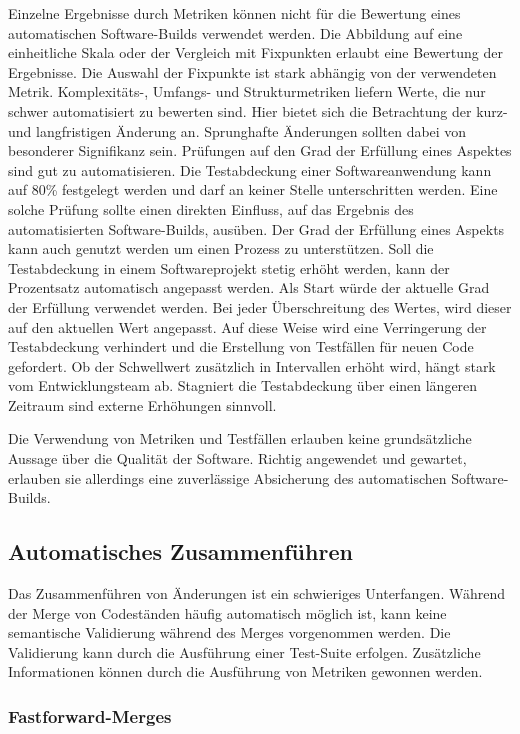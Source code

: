 Einzelne Ergebnisse durch Metriken können nicht für die Bewertung eines automatischen Software-Builds verwendet werden. Die Abbildung auf eine einheitliche Skala oder der Vergleich mit Fixpunkten erlaubt eine Bewertung der Ergebnisse. Die Auswahl der Fixpunkte ist stark abhängig von der verwendeten Metrik. Komplexitäts-, Umfangs- und Strukturmetriken liefern Werte, die nur schwer automatisiert zu bewerten sind. Hier bietet sich die Betrachtung der kurz- und langfristigen Änderung an. Sprunghafte Änderungen sollten dabei von besonderer Signifikanz sein. Prüfungen auf den Grad der Erfüllung eines Aspektes sind gut zu automatisieren. Die Testabdeckung einer Softwareanwendung kann auf 80\% festgelegt werden und darf an keiner Stelle unterschritten werden. Eine solche Prüfung sollte einen direkten Einfluss, auf das Ergebnis des automatisierten Software-Builds, ausüben. Der Grad der Erfüllung eines Aspekts kann auch genutzt werden um einen Prozess zu unterstützen. Soll die Testabdeckung in einem Softwareprojekt stetig erhöht werden, kann der Prozentsatz automatisch angepasst werden. Als Start würde der aktuelle Grad der Erfüllung verwendet werden. Bei jeder Überschreitung des Wertes, wird dieser auf den aktuellen Wert angepasst. Auf diese Weise wird eine Verringerung  der Testabdeckung verhindert und die Erstellung von Testfällen für neuen Code gefordert. Ob der Schwellwert zusätzlich in Intervallen erhöht wird, hängt stark vom Entwicklungsteam ab. Stagniert die Testabdeckung über einen längeren Zeitraum sind externe Erhöhungen sinnvoll.

Die Verwendung von Metriken und Testfällen erlauben keine grundsätzliche Aussage über die Qualität der Software. Richtig angewendet und gewartet, erlauben sie allerdings eine zuverlässige Absicherung des automatischen Software-Builds.

\subsection{Automatisches Zusammenführen}

Das Zusammenführen von Änderungen ist ein schwieriges Unterfangen. Während der Merge von Codeständen häufig automatisch möglich ist, kann keine semantische Validierung während des Merges vorgenommen werden. Die Validierung kann durch die Ausführung einer Test-Suite erfolgen. Zusätzliche Informationen können durch die Ausführung von Metriken gewonnen werden.

\subsubsection{Fastforward-Merges}

